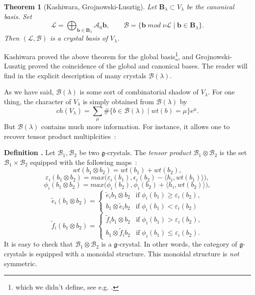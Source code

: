 \documentclass[a4paper,10pt]{amsart}
\def\g{\mathfrak{g}}
\newtheorem{theo}{\bf{Theorem}}[section]
\numberwithin{equation}{section}
\begin{document}
\vspace{.1in}

\begin{theo}[Kashiwara, Grojnowski-Lusztig] Let $\mathbf{B}_{\lambda} \subset V_{\lambda}$ be the canonical basis. Set
$$\mathcal{L}=\bigoplus_{\mathbf{b} \in \mathbf{B}_{\lambda}} \mathcal{A}_0 \mathbf{b}, \qquad \mathcal{B}=\{ \mathbf{b}\;mod\;\nu \mathcal{L} \;|\; \mathbf{b} \in \mathbf{B}_{\lambda}\}.$$
Then $(\mathcal{L}, \mathcal{B})$ is a crystal basis of $V_{\lambda}$.
\end{theo}

Kashiwara proved the above theorem for the global basis\footnote{which we didn't define, see e.g. \cite{Kang}.}, and Grojnowski-Lusztig proved the coincidence of the global and canonical bases. The reader will find in \cite{Kang} the explicit description of many crystals $\mathcal{B}(\lambda)$.

\vspace{.1in}

As we have said, $\mathcal{B}(\lambda)$ is some sort of combinatorial shadow of $V_{\lambda}$. For one thing, the character of $V_{\lambda}$ is simply obtained from $\mathcal{B}(\lambda)$ by
$$ch(V_{\lambda})=\sum_{\mu} \# \{ b \in \mathcal{B}(\lambda)\;|\; wt(b)=\mu\} e^{\mu}.$$
But $\mathcal{B}(\lambda)$ contains much more information. For instance, it allows one to recover tensor product multiplcities~:

\vspace{.2in}

\addtocounter{theo}{1}
\noindent \textbf{Definition \thetheo .} Let $\mathcal{B}_1, \mathcal{B}_2$ be two $\g$-crystals. The \textit{tensor product} $\mathcal{B}_1 \otimes \mathcal{B}_2$ is the set $\mathcal{B}_1 \times \mathcal{B}_2$ equipped with the following maps~:
$$ wt(b_1 \otimes b_2)=wt(b_1)+wt(b_2),$$
$$\varepsilon_i(b_1 \otimes b_2)=max\big( \varepsilon_i(b_1), \epsilon_i(b_2)-\langle h_i, wt(b_1)\rangle \big),$$
$$\phi_i(b_1 \otimes b_2)=max\big( \phi_i(b_2), \phi_i(b_2)+\langle h_i, wt(b_2)\rangle \big),$$
$$\tilde{e}_i(b_1 \otimes b_2)=\begin{cases} \tilde{e}_ib_1 \otimes b_2 & \text{if}\; \phi_i(b_1) \geq \varepsilon_i(b_2),\\ 
b_1 \otimes \tilde{e}_i b_2 & \text{if}\; \phi_i(b_1) < \varepsilon_i(b_2)
\end{cases} $$
$$\tilde{f}_i(b_1 \otimes b_2)=\begin{cases} \tilde{f}_ib_1 \otimes b_2 & \text{if}\; \phi_i(b_1) > \varepsilon_i(b_2),\\ 
b_1 \otimes \tilde{f}_i b_2 & \text{if}\; \phi_i(b_1) \leq \varepsilon_i(b_2).
\end{cases} $$
It is easy to check that $\mathcal{B}_1 \otimes \mathcal{B}_2$ is a $\g$-crystal. In other words, the category of $\g$-crystals is equipped with a monoidal structure. This monoidal structure is \textit{not} symmetric.
\end{document}
